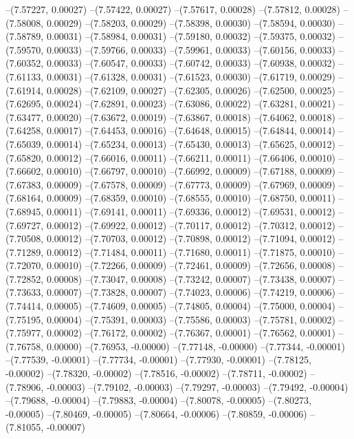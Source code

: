 --(7.57227, 0.00027)
--(7.57422, 0.00027)
--(7.57617, 0.00028)
--(7.57812, 0.00028)
--(7.58008, 0.00029)
--(7.58203, 0.00029)
--(7.58398, 0.00030)
--(7.58594, 0.00030)
--(7.58789, 0.00031)
--(7.58984, 0.00031)
--(7.59180, 0.00032)
--(7.59375, 0.00032)
--(7.59570, 0.00033)
--(7.59766, 0.00033)
--(7.59961, 0.00033)
--(7.60156, 0.00033)
--(7.60352, 0.00033)
--(7.60547, 0.00033)
--(7.60742, 0.00033)
--(7.60938, 0.00032)
--(7.61133, 0.00031)
--(7.61328, 0.00031)
--(7.61523, 0.00030)
--(7.61719, 0.00029)
--(7.61914, 0.00028)
--(7.62109, 0.00027)
--(7.62305, 0.00026)
--(7.62500, 0.00025)
--(7.62695, 0.00024)
--(7.62891, 0.00023)
--(7.63086, 0.00022)
--(7.63281, 0.00021)
--(7.63477, 0.00020)
--(7.63672, 0.00019)
--(7.63867, 0.00018)
--(7.64062, 0.00018)
--(7.64258, 0.00017)
--(7.64453, 0.00016)
--(7.64648, 0.00015)
--(7.64844, 0.00014)
--(7.65039, 0.00014)
--(7.65234, 0.00013)
--(7.65430, 0.00013)
--(7.65625, 0.00012)
--(7.65820, 0.00012)
--(7.66016, 0.00011)
--(7.66211, 0.00011)
--(7.66406, 0.00010)
--(7.66602, 0.00010)
--(7.66797, 0.00010)
--(7.66992, 0.00009)
--(7.67188, 0.00009)
--(7.67383, 0.00009)
--(7.67578, 0.00009)
--(7.67773, 0.00009)
--(7.67969, 0.00009)
--(7.68164, 0.00009)
--(7.68359, 0.00010)
--(7.68555, 0.00010)
--(7.68750, 0.00011)
--(7.68945, 0.00011)
--(7.69141, 0.00011)
--(7.69336, 0.00012)
--(7.69531, 0.00012)
--(7.69727, 0.00012)
--(7.69922, 0.00012)
--(7.70117, 0.00012)
--(7.70312, 0.00012)
--(7.70508, 0.00012)
--(7.70703, 0.00012)
--(7.70898, 0.00012)
--(7.71094, 0.00012)
--(7.71289, 0.00012)
--(7.71484, 0.00011)
--(7.71680, 0.00011)
--(7.71875, 0.00010)
--(7.72070, 0.00010)
--(7.72266, 0.00009)
--(7.72461, 0.00009)
--(7.72656, 0.00008)
--(7.72852, 0.00008)
--(7.73047, 0.00008)
--(7.73242, 0.00007)
--(7.73438, 0.00007)
--(7.73633, 0.00007)
--(7.73828, 0.00007)
--(7.74023, 0.00006)
--(7.74219, 0.00006)
--(7.74414, 0.00005)
--(7.74609, 0.00005)
--(7.74805, 0.00004)
--(7.75000, 0.00004)
--(7.75195, 0.00004)
--(7.75391, 0.00003)
--(7.75586, 0.00003)
--(7.75781, 0.00002)
--(7.75977, 0.00002)
--(7.76172, 0.00002)
--(7.76367, 0.00001)
--(7.76562, 0.00001)
--(7.76758, 0.00000)
--(7.76953, -0.00000)
--(7.77148, -0.00000)
--(7.77344, -0.00001)
--(7.77539, -0.00001)
--(7.77734, -0.00001)
--(7.77930, -0.00001)
--(7.78125, -0.00002)
--(7.78320, -0.00002)
--(7.78516, -0.00002)
--(7.78711, -0.00002)
--(7.78906, -0.00003)
--(7.79102, -0.00003)
--(7.79297, -0.00003)
--(7.79492, -0.00004)
--(7.79688, -0.00004)
--(7.79883, -0.00004)
--(7.80078, -0.00005)
--(7.80273, -0.00005)
--(7.80469, -0.00005)
--(7.80664, -0.00006)
--(7.80859, -0.00006)
--(7.81055, -0.00007)
